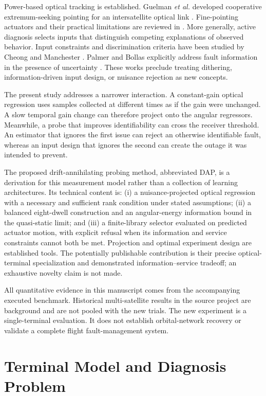 \documentclass[journal]{IEEEtran}
\begin{document}
Power-based optical tracking is established. Guelman \emph{et al.} developed cooperative extremum-seeking pointing for an intersatellite optical link \cite{guelman}. Fine-pointing actuators and their practical limitations are reviewed in \cite{milasevicius}. More generally, active diagnosis selects inputs that distinguish competing explanations of observed behavior. Input constraints and discrimination criteria have been studied by Cheong and Manchester \cite{cheong}. Palmer and Bollas explicitly address fault information in the presence of uncertainty \cite{palmer}. These works preclude treating dithering, information-driven input design, or nuisance rejection as new concepts.

The present study addresses a narrower interaction. A constant-gain optical regression uses samples collected at different times as if the gain were unchanged. A slow temporal gain change can therefore project onto the angular regressors. Meanwhile, a probe that improves identifiability can cross the receiver threshold. An estimator that ignores the first issue can reject an otherwise identifiable fault, whereas an input design that ignores the second can create the outage it was intended to prevent.

The proposed drift-annihilating probing method, abbreviated DAP, is a derivation for this measurement model rather than a collection of learning architectures. Its technical content is: (i) a nuisance-projected optical regression with a necessary and sufficient rank condition under stated assumptions; (ii) a balanced eight-dwell construction and an angular-energy information bound in the quasi-static limit; and (iii) a finite-library selector evaluated on predicted actuator motion, with explicit refusal when its information and service constraints cannot both be met. Projection and optimal experiment design are established tools. The potentially publishable contribution is their precise optical-terminal specialization and demonstrated information--service tradeoff; an exhaustive novelty claim is not made.

All quantitative evidence in this manuscript comes from the accompanying executed benchmark. Historical multi-satellite results in the source project are background and are not pooled with the new trials. The new experiment is a single-terminal evaluation. It does not establish orbital-network recovery or validate a complete flight fault-management system.

\section{Terminal Model and Diagnosis Problem}
\end{document}
